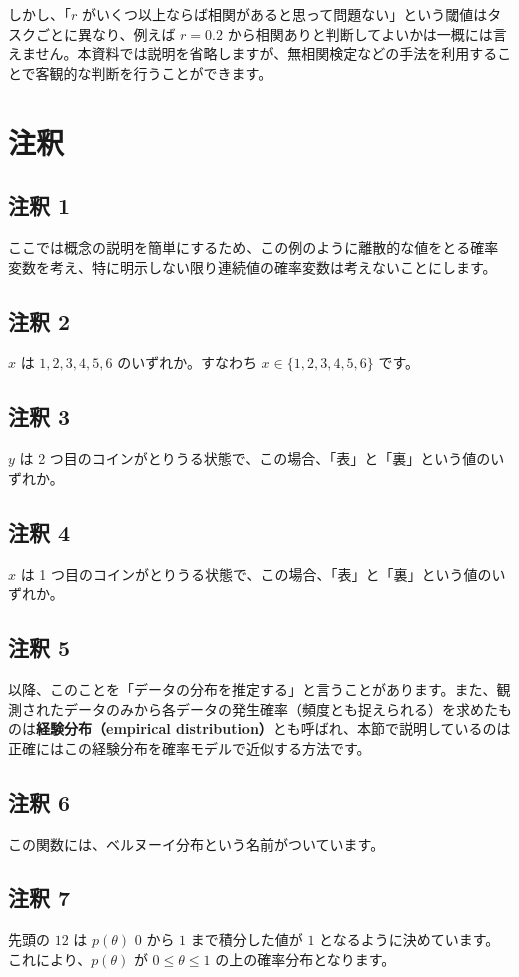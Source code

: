 しかし、「$r$ がいくつ以上ならば相関があると思って問題ない」という閾値はタスクごとに異なり、例えば $r=0.2$ から相関ありと判断してよいかは一概には言えません。本資料では説明を省略しますが、無相関検定などの手法を利用することで客観的な判断を行うことができます。


\section{注釈}


\subsection{注釈 1}
\label{06b-basics-of-probability-statistics-note1}


ここでは概念の説明を簡単にするため、この例のように離散的な値をとる確率変数を考え、特に明示しない限り連続値の確率変数は考えないことにします。


\subsection{注釈 2}
\label{06b-basics-of-probability-statistics-note2}


$x$ は $1, 2, 3, 4, 5, 6$ のいずれか。すなわち $x \in \{1, 2, 3, 4, 5, 6\}$ です。


\subsection{注釈 3}
\label{06b-basics-of-probability-statistics-note3}


$y$ は 2 つ目のコインがとりうる状態で、この場合、「表」と「裏」という値のいずれか。


\subsection{注釈 4}
\label{06b-basics-of-probability-statistics-note4}


$x$ は 1 つ目のコインがとりうる状態で、この場合、「表」と「裏」という値のいずれか。


\subsection{注釈 5}
\label{06b-basics-of-probability-statistics-note5}


以降、このことを「データの分布を推定する」と言うことがあります。また、観測されたデータのみから各データの発生確率（頻度とも捉えられる）を求めたものは\textbf{経験分布（empirical distribution）}とも呼ばれ、本節で説明しているのは正確にはこの経験分布を確率モデルで近似する方法です。


\subsection{注釈 6}
\label{06b-basics-of-probability-statistics-note6}


この関数には、ベルヌーイ分布という名前がついています。


\subsection{注釈 7}
\label{06b-basics-of-probability-statistics-note7}


先頭の $12$ は $p(\theta)$ $0$ から $1$ まで積分した値が $1$ となるように決めています。これにより、$p(\theta)$ が $0 \leq \theta \leq 1$ の上の確率分布となります。
